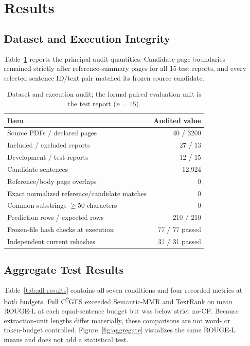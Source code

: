 \documentclass[applsci,article,submit,moreauthors]{Definitions/mdpi}
\newcommand{\cges}{C\textsuperscript{2}GES}
\begin{document}
\section{Results}

\subsection{Dataset and Execution Integrity}

Table~\ref{tab:audit} reports the principal audit quantities. Candidate page boundaries remained strictly after reference-summary pages for all 15 test reports, and every selected sentence ID/text pair matched its frozen source candidate.

\begin{table}[H]
\caption{Dataset and execution audit; the formal paired evaluation unit is the test report ($n=15$).}
\label{tab:audit}\centering
\begin{tabular}{lr}
\toprule
Item & Audited value\\
\midrule
Source PDFs / declared pages & 40 / 3200\\
Included / excluded reports & 27 / 13\\
Development / test reports & 12 / 15\\
Candidate sentences & 12,924\\
Reference/body page overlaps & 0\\
Exact normalized reference/candidate matches & 0\\
Common substrings $\geq50$ characters & 0\\
Prediction rows / expected rows & 210 / 210\\
Frozen-file hash checks at execution & 77 / 77 passed\\
Independent current rehashes & 31 / 31 passed\\
\bottomrule
\end{tabular}
\end{table}

\subsection{Aggregate Test Results}

Table~\ref{tab:all-results} contains all seven conditions and four recorded metrics at both budgets. Full \cges{} exceeded Semantic-MMR and TextRank on mean ROUGE-L at each equal-sentence budget but was below strict no-CF. Because extraction-unit lengths differ materially, these comparisons are not word- or token-budget controlled. Figure~\ref{fig:aggregate} visualizes the same ROUGE-L means and does not add a statistical test.
\end{document}
